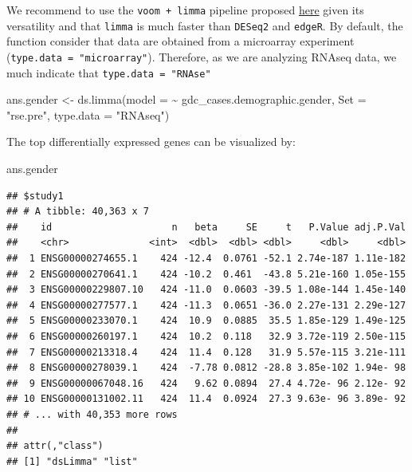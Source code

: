 \documentclass[
]{book}
\newenvironment{Shaded}{\begin{snugshade}}{\end{snugshade}}
\newcommand{\AttributeTok}[1]{\textcolor[rgb]{0.77,0.63,0.00}{#1}}
\newcommand{\FunctionTok}[1]{\textcolor[rgb]{0.00,0.00,0.00}{#1}}
\newcommand{\NormalTok}[1]{#1}
\newcommand{\OtherTok}[1]{\textcolor[rgb]{0.56,0.35,0.01}{#1}}
\newcommand{\SpecialCharTok}[1]{\textcolor[rgb]{0.00,0.00,0.00}{#1}}
\newcommand{\StringTok}[1]{\textcolor[rgb]{0.31,0.60,0.02}{#1}}
\begin{document}
We recommend to use the \texttt{voom\ +\ limma} pipeline proposed \href{https://f1000research.com/articles/5-1438/v2}{here} given its versatility and that \texttt{limma} is much faster than \texttt{DESeq2} and \texttt{edgeR}. By default, the function consider that data are obtained from a microarray experiment (\texttt{type.data\ =\ "microarray"}). Therefore, as we are analyzing RNAseq data, we much indicate that \texttt{type.data\ =\ "RNAse"}

\begin{Shaded}
\begin{Highlighting}[]
\NormalTok{ans.gender }\OtherTok{\textless{}{-}} \FunctionTok{ds.limma}\NormalTok{(}\AttributeTok{model =}  \SpecialCharTok{\textasciitilde{}}\NormalTok{ gdc\_cases.demographic.gender, }
                       \AttributeTok{Set =} \StringTok{"rse.pre"}\NormalTok{, }\AttributeTok{type.data =} \StringTok{"RNAseq"}\NormalTok{)}
\end{Highlighting}
\end{Shaded}

The top differentially expressed genes can be visualized by:

\begin{Shaded}
\begin{Highlighting}[]
\NormalTok{ans.gender}
\end{Highlighting}
\end{Shaded}

\begin{verbatim}
## $study1
## # A tibble: 40,363 x 7
##    id                     n   beta     SE     t   P.Value adj.P.Val
##    <chr>              <int>  <dbl>  <dbl> <dbl>     <dbl>     <dbl>
##  1 ENSG00000274655.1    424 -12.4  0.0761 -52.1 2.74e-187 1.11e-182
##  2 ENSG00000270641.1    424 -10.2  0.461  -43.8 5.21e-160 1.05e-155
##  3 ENSG00000229807.10   424 -11.0  0.0603 -39.5 1.08e-144 1.45e-140
##  4 ENSG00000277577.1    424 -11.3  0.0651 -36.0 2.27e-131 2.29e-127
##  5 ENSG00000233070.1    424  10.9  0.0885  35.5 1.85e-129 1.49e-125
##  6 ENSG00000260197.1    424  10.2  0.118   32.9 3.72e-119 2.50e-115
##  7 ENSG00000213318.4    424  11.4  0.128   31.9 5.57e-115 3.21e-111
##  8 ENSG00000278039.1    424  -7.78 0.0812 -28.8 3.85e-102 1.94e- 98
##  9 ENSG00000067048.16   424   9.62 0.0894  27.4 4.72e- 96 2.12e- 92
## 10 ENSG00000131002.11   424  11.4  0.0924  27.3 9.63e- 96 3.89e- 92
## # ... with 40,353 more rows
## 
## attr(,"class")
## [1] "dsLimma" "list"
\end{verbatim}
\end{document}
